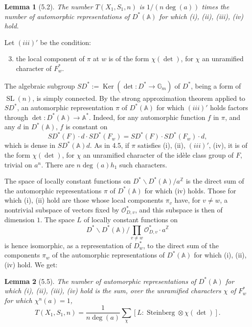\documentclass[10pt]{article}
\newcommand{\Z}{\mathbb Z}
\newcommand{\Adele}{\mathbb A}
\newcommand{\Gm}{\mathbb G_m}
\newcommand{\SL}{\operatorname{SL}}
\newcommand{\degm}{\operatorname{deg}}
\theoremstyle{deligne}
\newtheorem*{lemma*}{Lemma}
\newcommand{\Stein}{\operatorname{Steinberg}}
\newcommand{\Ker}{\operatorname{Ker}}
\newcommand{\heading}[1]{\vspace{0.7em}\noindent{\bfseries #1}\quad}
\begin{document}
\begin{lemma*}[5.2]
The number $T(X_1,S_1,n)$ is $1/(n\degm(a))$ times the number of automorphic representations of $D^*(\Adele)$ for which (i), (ii), (iii), (iv) hold.
\end{lemma*}

\heading{5.3.} Let $(iii)'$ be the condition:
\begin{enumerate}[label=(\roman*)$'$]
\setcounter{enumi}{2}
\item the local component of $\pi$ at $w$ is of the form $\chi(\det)$, for $\chi$ an unramified character of $F_w^*$.
\end{enumerate}
The algebraic subgroup $SD^*:=\Ker(\det:D^*\to\Gm)$ of $D^*$, being a form of $\SL(n)$, is simply connected. By the strong approximation theorem applied to $SD^*$, an automorphic representation $\pi$ of $D^*(\Adele)$ for which $(iii)'$ holds factors through $\det:D^*(\Adele)\to\Adele^*$. Indeed, for any automorphic function $f$ in $\pi$, and any $d$ in $D^*(\Adele)$, $f$ is constant on
\[
SD^*(F)\cdot d\cdot SD^*(F_w)=SD^*(F)\cdot SD^*(F_w)\cdot d,
\]
which is dense in $SD^*(\Adele)d$. As in 4.5, if $\pi$ satisfies (i), (ii), $(iii)'$, (iv), it is of the form $\chi(\det)$, for $\chi$ an unramified character of the id\`ele class group of $F$, trivial on $a^n$. There are $n\degm(a)h_1$ such characters.

\heading{5.4.} The space of locally constant functions on $D^*\backslash D^*(\Adele)/a^\Z$ is the direct sum of the automorphic representations $\pi$ of $D^*(\Adele)$ for which (iv) holds. Those for which (i), (ii) hold are those whose local components $\pi_v$ have, for $v\ne w$, a nontrivial subspace of vectors fixed by $\mathcal O_{D,v}^*$, and this subspace is then of dimension $1$. The space $L$ of locally constant functions on
\[
D^*\backslash D^*(\Adele)/\prod_{v\ne w}\mathcal O_{D,v}^*\cdot a^\Z
\]
is hence isomorphic, as a representation of $D_w^*$, to the direct sum of the components $\pi_w$ of the automorphic representations of $D^*(\Adele)$ for which (i), (ii), (iv) hold. We get:

\begin{lemma*}[5.5]
The number of automorphic representations of $D^*(\Adele)$ for which (i), (ii), (iii), (iv) hold is the sum, over the unramified characters $\chi$ of $F_w^*$ for which $\chi^n(a)=1$,
\begin{equation}\tag{5.5.1}
T(X_1,S_1,n)=\frac{1}{n\degm(a)}\sum_\chi [L:\Stein\otimes\chi(\det)].
\end{equation}
\end{lemma*}
\end{document}
